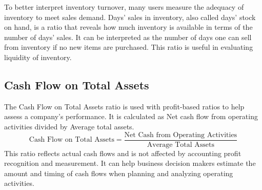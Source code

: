 \documentclass[../main.tex]{subfiles}
\begin{document}
	To better interpret inventory turnover, many users measure the adequacy of inventory to meet sales 
	demand. Days’ sales in inventory, also called days’ stock on hand, is a ratio that reveals how 
	much inventory is available in terms of the number of days’ sales. It can be interpreted as the 
	number of days one can sell from inventory if no new items are purchased. This ratio is useful in 
	evaluating liquidity of inventory.
	
	\subsection{Cash Flow on Total Assets}
	
	The Cash Flow on Total Assets ratio is used with profit-based ratios to help assess a company’s performance.  It is calculated as Net cash 
	flow from operating activities divided by Average total assets.
	\[
	\text{Cash Flow on Total Assets} = \frac{\text{Net Cash from Operating Activities}}{\text{Average Total Assets}}
	\]
	This ratio reflects actual cash flows and is not affected by accounting profit recognition and measurement. It can help business decision 
	makers estimate the amount and timing of cash flows when planning and analyzing operating activities.
	
\end{document}

